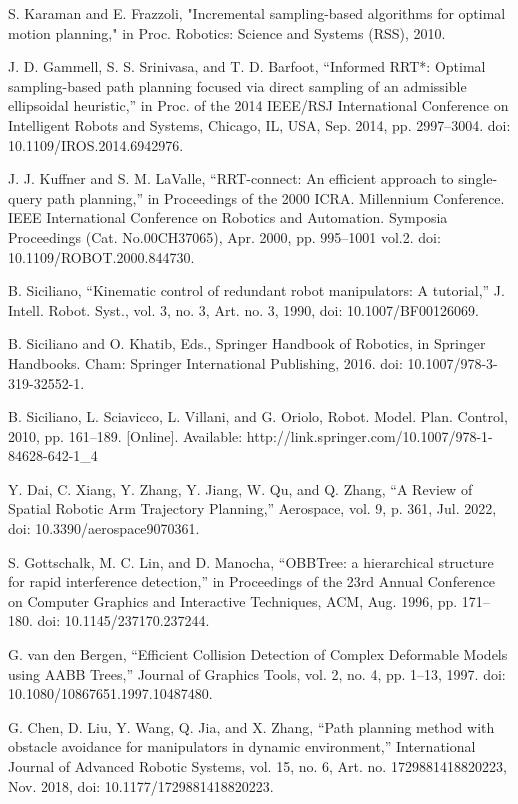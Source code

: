 \documentclass[letterpaper, 10 pt, conference]{ieeeconf}  %
\begin{document}
\begin{thebibliography}{99}
 S. Karaman and E. Frazzoli, "Incremental sampling-based algorithms for optimal motion planning," in Proc. Robotics: Science and Systems (RSS), 2010.

 J. D. Gammell, S. S. Srinivasa, and T. D. Barfoot, “Informed RRT*: Optimal sampling-based path planning focused via direct sampling of an admissible ellipsoidal heuristic,” in Proc. of the 2014 IEEE/RSJ International Conference on Intelligent Robots and Systems, Chicago, IL, USA, Sep. 2014, pp. 2997–3004. doi: 10.1109/IROS.2014.6942976.

 J. J. Kuffner and S. M. LaValle, “RRT-connect: An efficient approach to single-query path planning,” in Proceedings of the 2000 ICRA. Millennium Conference. IEEE International Conference on Robotics and Automation. Symposia Proceedings (Cat. No.00CH37065), Apr. 2000, pp. 995–1001 vol.2. doi: 10.1109/ROBOT.2000.844730.

 B. Siciliano, “Kinematic control of redundant robot manipulators: A tutorial,” J. Intell. Robot. Syst., vol. 3, no. 3, Art. no. 3, 1990, doi: 10.1007/BF00126069.

 B. Siciliano and O. Khatib, Eds., Springer Handbook of Robotics, in Springer Handbooks. Cham: Springer International Publishing, 2016. doi: 10.1007/978-3-319-32552-1.

 B. Siciliano, L. Sciavicco, L. Villani, and G. Oriolo, Robot. Model. Plan. Control, 2010, pp. 161–189. [Online]. Available: http://link.springer.com/10.1007/978-1-84628-642-1\_4

 Y. Dai, C. Xiang, Y. Zhang, Y. Jiang, W. Qu, and Q. Zhang, “A Review of Spatial Robotic Arm Trajectory Planning,” Aerospace, vol. 9, p. 361, Jul. 2022, doi: 10.3390/aerospace9070361.

 S. Gottschalk, M. C. Lin, and D. Manocha, “OBBTree: a hierarchical structure for rapid interference detection,” in Proceedings of the 23rd Annual Conference on Computer Graphics and Interactive Techniques, ACM, Aug. 1996, pp. 171–180. doi: 10.1145/237170.237244.

 G. van den Bergen, “Efficient Collision Detection of Complex Deformable Models using AABB Trees,” Journal of Graphics Tools, vol. 2, no. 4, pp. 1–13, 1997. doi: 10.1080/10867651.1997.10487480.

 G. Chen, D. Liu, Y. Wang, Q. Jia, and X. Zhang, “Path planning method with obstacle avoidance for manipulators in dynamic environment,” International Journal of Advanced Robotic Systems, vol. 15, no. 6, Art. no. 1729881418820223, Nov. 2018, doi: 10.1177/1729881418820223.


\end{thebibliography}
\end{document}
